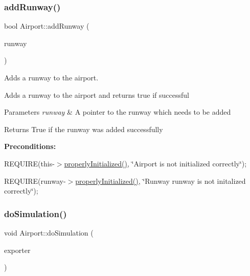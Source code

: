 \subsubsection{\texorpdfstring{add\+Runway()}{addRunway()}}
{\footnotesize\ttfamily bool Airport\+::add\+Runway (\begin{DoxyParamCaption}\item[{\mbox{\hyperlink{class_runway}{Runway}} $\ast$}]{runway }\end{DoxyParamCaption})}



Adds a runway to the airport. 

Adds a runway to the airport and returns true if successful


\begin{DoxyParams}{Parameters}
{\em runway} & A pointer to the runway which needs to be added \\
\hline
\end{DoxyParams}
\begin{DoxyReturn}{Returns}
True if the runway was added successfully
\end{DoxyReturn}
{\bfseries Preconditions\+:}
\begin{DoxyItemize}
\item R\+E\+Q\+U\+I\+RE(this-\/$>$\mbox{\hyperlink{class_airport_aa13e68ac58e8875837fbe888325cfff6}{properly\+Initialized()}}, \char`\"{}\+Airport is not initialized correctly\char`\"{});
\item R\+E\+Q\+U\+I\+RE(runway-\/$>$\mbox{\hyperlink{class_airport_aa13e68ac58e8875837fbe888325cfff6}{properly\+Initialized()}}, \char`\"{}\+Runway \textquotesingle{}runway\textquotesingle{} is not initalized correctly\char`\"{}); 
\end{DoxyItemize}\mbox{\label{class_airport_a07b5744d0a5fc278437140b20bcd9b7f}} 
\subsubsection{\texorpdfstring{do\+Simulation()}{doSimulation()}}
{\footnotesize\ttfamily void Airport\+::do\+Simulation (\begin{DoxyParamCaption}\item[{\mbox{\hyperlink{class_airport_exporter}{Airport\+Exporter}} $\ast$}]{exporter }\end{DoxyParamCaption})}



